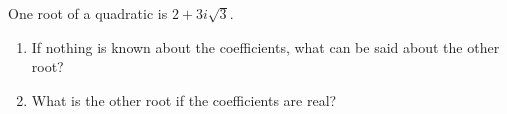 One root of a quadratic is $2+3i\sqrt3$.
\begin{enumerate}
\item[(a)] If nothing is known about the coefficients, what can be said about the other root?
\item[(b)] What is the other root if the coefficients are real?
\end{enumerate}
